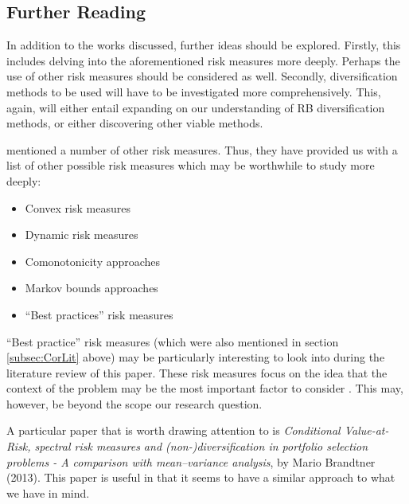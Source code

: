 \documentclass[12pt,a4paper]{article}
\newcommand{\bi}{\begin{itemize}}
\newcommand{\ei}{\end{itemize}}
\begin{document}
\subsection{Further Reading}
\label{subsec:FurRead}

In addition to the works discussed, further ideas should be explored. Firstly, this includes delving into the aforementioned risk measures more deeply. Perhaps the use of other risk measures should be considered as well. Secondly, diversification methods to be used will have to be investigated more comprehensively. This, again, will either entail expanding on our understanding of RB diversification methods, or either discovering other viable methods. 

\cite{dowd2006after} mentioned a number of other risk measures. Thus, they have provided us with a list of other possible risk measures which may be worthwhile to study more deeply:

\bi
\item Convex risk measures
\item Dynamic risk measures
\item Comonotonicity approaches
\item Markov bounds approaches
\item ``Best practices'' risk measures
\ei
 
``Best practice'' risk measures (which were also mentioned in section \ref{subsec:CorLit} above) may be particularly interesting to look into during the literature review of this paper. These risk measures focus on the idea that the context of the problem may be the most important factor to consider \citep{dowd2006after}. This may, however, be beyond the scope our research question.

A particular paper that is worth drawing attention to is  \textit{Conditional Value-at-Risk, spectral risk measures and (non-)diversification in portfolio selection problems - A comparison with mean–variance analysis}, by Mario Brandtner (2013). This paper is useful in that it seems to have a similar approach to what we have in mind.
\end{document}

